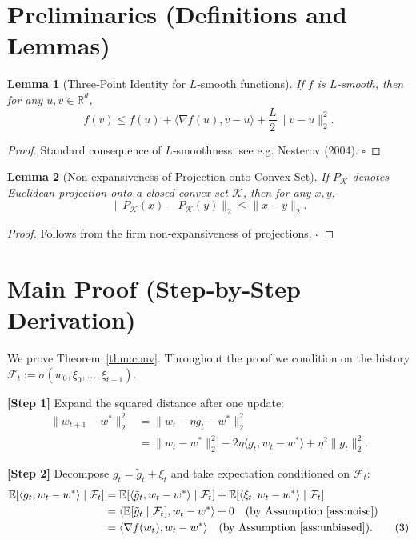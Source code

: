 \documentclass{article}
\newtheorem{lemma}{Lemma}
\newcommand{\E}{\mathbb{E}}
\newcommand{\R}{\mathbb{R}}
\begin{document}
\section*{Preliminaries (Definitions and Lemmas)}
\begin{lemma}[Three‑Point Identity for $L$‑smooth functions]\label{lem:3pt}
If $f$ is $L$‑smooth, then for any $u,v\in\R^{d}$,
\[
f(v)\le f(u)+\langle\nabla f(u),v-u\rangle+\frac{L}{2}\|v-u\|_2^{2}.
\]
\end{lemma}
\begin{proof}
Standard consequence of $L$‑smoothness; see e.g. Nesterov (2004). \hfill $\square$
\end{proof}

\begin{lemma}[Non‑expansiveness of Projection onto Convex Set]\label{lem:proj}
If $P_{\mathcal{K}}$ denotes Euclidean projection onto a closed convex set $\mathcal{K}$, then for any $x,y$,
\[
\|P_{\mathcal{K}}(x)-P_{\mathcal{K}}(y)\|_2\le\|x-y\|_2 .
\]
\end{lemma}
\begin{proof}
Follows from the firm non‑expansiveness of projections. \hfill $\square$
\end{proof}

\section*{Main Proof (Step‑by‑Step Derivation)}
We prove Theorem~\ref{thm:conv}.  Throughout the proof we condition on the history $\mathcal{F}_t:=\sigma(w_0,\xi_0,\dots,\xi_{t-1})$.

\noindent\textbf{[Step 1]}  Expand the squared distance after one update:
\begin{align}
\|w_{t+1}-w^{*}\|_2^{2}
&=\|w_t-\eta g_t-w^{*}\|_2^{2} \nonumber\\
&=\|w_t-w^{*}\|_2^{2}
-2\eta\langle g_t,w_t-w^{*}\rangle
+\eta^{2}\|g_t\|_2^{2}. \tag{2}
\end{align}

\noindent\textbf{[Step 2]}  Decompose $g_t=\tilde g_t+\xi_t$ and take expectation conditioned on $\mathcal{F}_t$:
\begin{align}
\E[\langle g_t,w_t-w^{*}\rangle\mid\mathcal{F}_t]
&=\E[\langle\tilde g_t,w_t-w^{*}\rangle\mid\mathcal{F}_t]
+\E[\langle\xi_t,w_t-w^{*}\rangle\mid\mathcal{F}_t] \nonumber\\
&=\langle\E[\tilde g_t\mid\mathcal{F}_t],w_t-w^{*}\rangle
+0 \quad\text{(by Assumption~\ref{ass:noise})} \nonumber\\
&=\langle\nabla f(w_t),w_t-w^{*}\rangle
\quad\text{(by Assumption~\ref{ass:unbiased})}. \tag{3}
\end{align}
\end{document}
